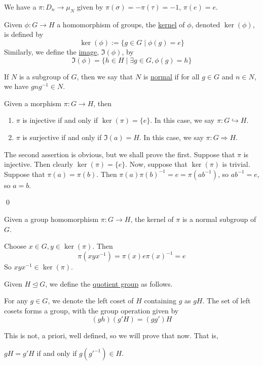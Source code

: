\documentclass[x11names,reqno,14pt]{extarticle}
\begin{document}
\exm

We have a $\pi:D_n\to\mu_N$ given by $\pi(\sigma)= -\pi(\tau) = -1$, $\pi(e) = e$. 


Given $\phi:G\to H$ a homomorphism of groups, the \underline{kernel} of $\phi$, denoted $\ker(\phi)$, is defined by
\[
\ker(\phi) := \{g \in G \mid \phi(g) = e \}
\]
Similarly, we define the \underline{image}, $\Im(\phi)$, by 
\[
\Im(\phi) = \{h \in H \mid \exists g \in G, \phi(g) = h \}
\]


If $N$ is a subgroup of $G$, then we say that $N$ is \underline{normal} if for all $g \in G$ and $n \in N$, we have $gng^{-1} \in N$. 

\lem Given a morphism $\pi: G\to H$, then 
\begin{enumerate}
\item $\pi$ is injective if and only if $\ker(\pi) = \{e\}$. In this case, we say $\pi:G\hookrightarrow H$. 
\item $\pi$ is surjective if and only if $\Im(a) = H$. In this case, we say $\pi:G\Rightarrow H$. 
\end{enumerate}

\proof

The second assertion is obvious, but we shall prove the first. Suppose that $\pi$ is injective. Then clearly $\ker(\pi) = \{e\}$. Now, suppose that $\ker(\pi)$ is trivial. Suppose that $\pi(a) = \pi(b)$. Then $\pi(a)\pi(b)^{-1} = e = \pi(ab^{-1})$, so $ab^{-1} = e$, so $a = b$. 

\qed

\prop

Given a group homomorphism $\pi: G\to H$, the kernel of $\pi$ is a normal subgroup of $G$. 

\proof

Choose $x \in G, y \in \ker(\pi)$. Then 
\[
\pi(xyx^{-1}) = \pi(x)e\pi(x)^{-1} = e
\]
So $xyx^{-1} \in \ker(\pi)$. 


Given $H\unlhd G$, we define the \underline{quotient group} as follows. 

For any $g \in G$, we denote the left coset of $H$ containing $g$ as $gH$. The set of left cosets forms a group, with the group operation given by 
\[
(gh)(g'H) = (gg')H
\]

This is not, a priori, well defined, so we will prove that now. That is, 

\lem 

$gH = g'H$ if and only if $g(g'^{-1}) \in H$. 
\end{document}
